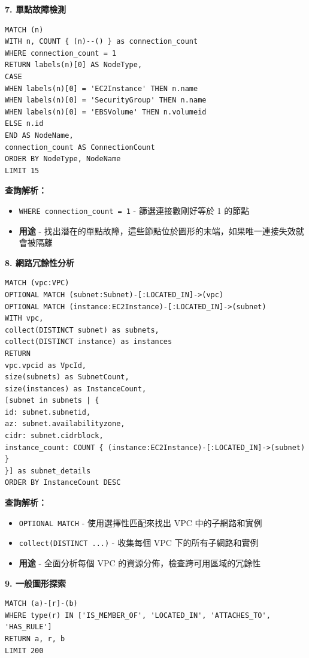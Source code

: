 \documentclass[11pt,a4paper]{ctexart}
\begin{document}
\textbf{7. 單點故障檢測}

\begin{lstlisting}[language=Cypher,caption={找出單點故障}]
MATCH (n)
WITH n, COUNT { (n)--() } as connection_count
WHERE connection_count = 1
RETURN labels(n)[0] AS NodeType,
CASE
WHEN labels(n)[0] = 'EC2Instance' THEN n.name
WHEN labels(n)[0] = 'SecurityGroup' THEN n.name
WHEN labels(n)[0] = 'EBSVolume' THEN n.volumeid
ELSE n.id
END AS NodeName,
connection_count AS ConnectionCount
ORDER BY NodeType, NodeName
LIMIT 15
\end{lstlisting}

\textbf{查詢解析：}
\begin{itemize}[leftmargin=1.5em]
\item \texttt{WHERE connection\_count = 1} - 篩選連接數剛好等於 1 的節點
\item \textbf{用途} - 找出潛在的單點故障，這些節點位於圖形的末端，如果唯一連接失效就會被隔離
\end{itemize}

\textbf{8. 網路冗餘性分析}

\begin{lstlisting}[language=Cypher,caption={網路冗餘性分析}]
MATCH (vpc:VPC)
OPTIONAL MATCH (subnet:Subnet)-[:LOCATED_IN]->(vpc)
OPTIONAL MATCH (instance:EC2Instance)-[:LOCATED_IN]->(subnet)
WITH vpc, 
collect(DISTINCT subnet) as subnets,
collect(DISTINCT instance) as instances
RETURN
vpc.vpcid as VpcId,
size(subnets) as SubnetCount,
size(instances) as InstanceCount,
[subnet in subnets | {
id: subnet.subnetid,
az: subnet.availabilityzone,
cidr: subnet.cidrblock,
instance_count: COUNT { (instance:EC2Instance)-[:LOCATED_IN]->(subnet) }
}] as subnet_details
ORDER BY InstanceCount DESC
\end{lstlisting}

\textbf{查詢解析：}
\begin{itemize}[leftmargin=1.5em]
\item \texttt{OPTIONAL MATCH} - 使用選擇性匹配來找出 VPC 中的子網路和實例
\item \texttt{collect(DISTINCT ...)} - 收集每個 VPC 下的所有子網路和實例
\item \textbf{用途} - 全面分析每個 VPC 的資源分佈，檢查跨可用區域的冗餘性
\end{itemize}

\textbf{9. 一般圖形探索}

\begin{lstlisting}[language=Cypher,caption={一般圖形探索}]
MATCH (a)-[r]-(b) 
WHERE type(r) IN ['IS_MEMBER_OF', 'LOCATED_IN', 'ATTACHES_TO', 'HAS_RULE'] 
RETURN a, r, b 
LIMIT 200
\end{lstlisting}
\end{document}
